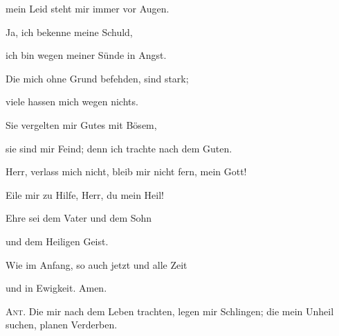 mein Leid steht mir immer vor Augen.
 
\noindent Ja, ich bekenne meine Schuld,~\GreStar{}~\nopagebreak

ich bin wegen meiner Sünde in Angst.
 
\noindent Die mich ohne Grund befehden, sind stark;~\GreStar{}~\nopagebreak

viele hassen mich wegen nichts.
 
\noindent Sie vergelten mir Gutes mit Bösem,~\GreStar{}~\nopagebreak

sie sind mir Feind; denn ich trachte nach dem Guten.
 
\noindent Herr, verlass mich nicht, bleib mir nicht fern, mein Gott!~\GreStar{}~\nopagebreak

Eile mir zu Hilfe, Herr, du mein Heil!

\noindent Ehre sei dem Vater und dem Sohn~\GreStar{}~\nopagebreak

und dem Heiligen Geist.

\noindent Wie im Anfang, so auch jetzt und alle Zeit~\GreStar{}~\nopagebreak

und in Ewigkeit. Amen.

\vspace{10pt}

\noindent \textsc{Ant.} Die mir nach dem Leben trachten, legen mir Schlingen; die mein Unheil suchen, planen Verderben.

